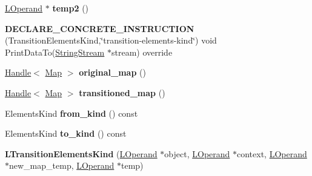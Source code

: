 \begin{DoxyCompactItemize}
\item 
\hyperlink{classv8_1_1internal_1_1_l_operand}{L\+Operand} $\ast$ {\bfseries temp2} ()\hypertarget{classv8_1_1internal_1_1_l_transition_elements_kind_aa6d0931ff2ba1854c40d28875014f9f7}{}\label{classv8_1_1internal_1_1_l_transition_elements_kind_aa6d0931ff2ba1854c40d28875014f9f7}

\item 
{\bfseries D\+E\+C\+L\+A\+R\+E\+\_\+\+C\+O\+N\+C\+R\+E\+T\+E\+\_\+\+I\+N\+S\+T\+R\+U\+C\+T\+I\+ON} (Transition\+Elements\+Kind,\char`\"{}transition-\/elements-\/kind\char`\"{}) void Print\+Data\+To(\hyperlink{classv8_1_1internal_1_1_string_stream}{String\+Stream} $\ast$stream) override\hypertarget{classv8_1_1internal_1_1_l_transition_elements_kind_ac3d3fcdb1323fb5a8ffe1c35ad9d633e}{}\label{classv8_1_1internal_1_1_l_transition_elements_kind_ac3d3fcdb1323fb5a8ffe1c35ad9d633e}

\item 
\hyperlink{classv8_1_1internal_1_1_handle}{Handle}$<$ \hyperlink{classv8_1_1internal_1_1_map}{Map} $>$ {\bfseries original\+\_\+map} ()\hypertarget{classv8_1_1internal_1_1_l_transition_elements_kind_a1f6534ac0fae8a2a00aacbdb977df2e1}{}\label{classv8_1_1internal_1_1_l_transition_elements_kind_a1f6534ac0fae8a2a00aacbdb977df2e1}

\item 
\hyperlink{classv8_1_1internal_1_1_handle}{Handle}$<$ \hyperlink{classv8_1_1internal_1_1_map}{Map} $>$ {\bfseries transitioned\+\_\+map} ()\hypertarget{classv8_1_1internal_1_1_l_transition_elements_kind_a4ffe4230acac522bfd54c3789ccd213b}{}\label{classv8_1_1internal_1_1_l_transition_elements_kind_a4ffe4230acac522bfd54c3789ccd213b}

\item 
Elements\+Kind {\bfseries from\+\_\+kind} () const \hypertarget{classv8_1_1internal_1_1_l_transition_elements_kind_a1e1ff9a309d57dec082f66c3ab5ae91f}{}\label{classv8_1_1internal_1_1_l_transition_elements_kind_a1e1ff9a309d57dec082f66c3ab5ae91f}

\item 
Elements\+Kind {\bfseries to\+\_\+kind} () const \hypertarget{classv8_1_1internal_1_1_l_transition_elements_kind_abeb207d90c90fbe766e55ebfd9985ebc}{}\label{classv8_1_1internal_1_1_l_transition_elements_kind_abeb207d90c90fbe766e55ebfd9985ebc}

\item 
{\bfseries L\+Transition\+Elements\+Kind} (\hyperlink{classv8_1_1internal_1_1_l_operand}{L\+Operand} $\ast$object, \hyperlink{classv8_1_1internal_1_1_l_operand}{L\+Operand} $\ast$context, \hyperlink{classv8_1_1internal_1_1_l_operand}{L\+Operand} $\ast$new\+\_\+map\+\_\+temp, \hyperlink{classv8_1_1internal_1_1_l_operand}{L\+Operand} $\ast$temp)\hypertarget{classv8_1_1internal_1_1_l_transition_elements_kind_a7657f031166385be3dcf06f6fec20a59}{}\label{classv8_1_1internal_1_1_l_transition_elements_kind_a7657f031166385be3dcf06f6fec20a59}


\end{DoxyCompactItemize}
